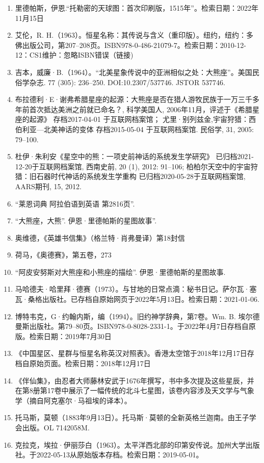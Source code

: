 \begin{enumerate}
\item 里德帕斯，伊恩.“托勒密的天球图：首次印刷版，1515年”。检索日期：2022年11月15日
\item 艾伦，R. H.（1963）。恒星名称：其传说与含义（重印版）。纽约，纽约：多佛出版公司，第207–208页。ISBN978-0-486-21079-7。检索日期：2010-12-12：CS1维护：忽略ISBN错误（链接)
\item 吉本，威廉·B.（1964）。“北美星象传说中的亚洲相似之处：大熊座”。美国民俗学杂志. 77 (305): 236–250. DOI:10.2307/537746. JSTOR 537746.
\item 布拉德利·E·谢弗希腊星座的起源：大熊座是否在猎人游牧民族于一万三千多年前首次抵达美洲之前就已命名？, 科学美国人, 2006年11月，评述于《希腊星座的起源》 存档2017-04-01 于互联网档案馆； 尤里·别列兹金,宇宙狩猎：西伯利亚—北美神话的变体 存档2015-05-04 于互联网档案馆. 民俗学, 31, 2005: 79–100.
\item 杜伊·朱利安《星空中的熊：一项史前神话的系统发生学研究》 已归档2021-12-20于互联网档案馆, 西南史前, 20 (1), 2012: 91–106; 柏柏尔天空中的宇宙狩猎：旧石器时代神话的系统发生学重构 已归档2020-05-28于互联网档案馆, AARS期刊, 15, 2012.
\item “莱恩词典 阿拉伯语到英语 第2816页”.
\item “大熊座，大熊”. 伊恩·里德帕斯的星图故事”.
\item 奥维德，《英雄书信集》（格兰特·肖弗曼译）第18封信
\item 荷马，《奥德赛》，第五卷，273
\item “阿皮安努斯对大熊座和小熊座的描绘”. 伊恩·里德帕斯的星图故事.
\item 马哈德夫·哈里拜·德赛（1973）。与甘地的日常点滴：秘书日记。萨尔瓦·塞瓦·桑格出版社。已存档自原始网页于2022年5月13日。检索日期：2021-01-06.
\item 博特韦克，G·约翰内斯，编（1994）。旧约神学辞典，第7卷。Wm. B. 埃尔德曼斯出版社。第79–80页。ISBN978-0-8028-2331-1。于2022年4月7日存档自原版。检索日期：2019年7月30日
\item 《中国星区、星群与恒星名称英汉对照表》。香港太空馆于2018年12月17日存档自原始页面。检索日期：2018年12月17日
\item 《伴仙集》，由忍者大师藤林安武于1676年撰写，书中多次提及这些星辰，并在第8册第17卷中展示了一幅传统的北斗七星图，该卷内容涉及天文学与气象学（摘自阿克塞尔·马祖埃的译本）。
\item 托马斯，莫顿（1883年9月13日）。托马斯·莫顿的全新英格兰迦南。由王子学会出版。OL 7142058M.
\item 克拉克，埃拉·伊丽莎白（1963）。太平洋西北部的印第安传说。加州大学出版社。于2022-05-13从原始版本存档。检索日期：2019-05-01。

\end{enumerate}
